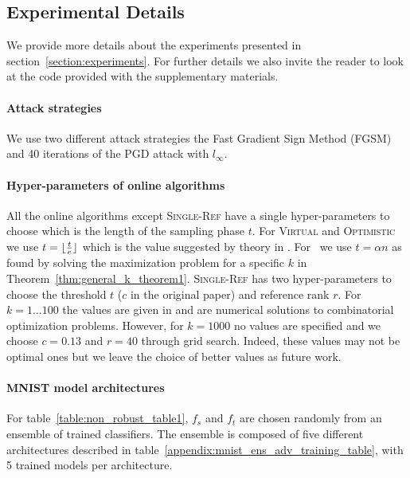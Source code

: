 \subsection{Experimental Details}
\label{appendix:additional_results_larger_datasets}
We provide more details about the experiments presented in section~\ref{section:experiments}. For further details we also invite the reader to look at the code provided with the supplementary materials.

\paragraph{Attack strategies} We use two different attack strategies the Fast Gradient Sign Method (FGSM) \citep{goodfellow2014explaining} and 40 iterations of the PGD attack \citep{madry2017towards} with $l_\infty$.

\paragraph{Hyper-parameters of online algorithms} All the online algorithms except \textsc{Single-Ref} have a single hyper-parameters to choose which is the length of the sampling phase $t$. For \textsc{Virtual} and \textsc{Optimistic} we use $t=\lfloor  \frac{t}{e} \rfloor$ which is the value suggested by theory in \citet{babaioff2007knapsack}. For \algoname \ we use $t=\alpha n$  as found by solving the maximization problem for a specific $k$ in Theorem~\ref{thm:general_k_theorem1}. \textsc{Single-Ref} has two hyper-parameters to choose the threshold $t$ ($c$ in the original paper) and reference rank $r$. For $k=1...100$ the values are given in \citet{albers2020new} and are numerical solutions to combinatorial optimization problems. However, for $k = 1000$ no values are specified and we choose $c=0.13$ and $r=40$ through grid search. Indeed, these values may not be optimal ones but we leave the choice of better values as future work.

\paragraph{MNIST model architectures} For table~\ref{table:non_robust_table1}, $f_s$ and $f_t$ are chosen randomly from an ensemble of trained classifiers. The ensemble is composed of five different architectures described in table~\ref{appendix:mnist_ens_adv_training_table}, with 5 trained models per architecture.

